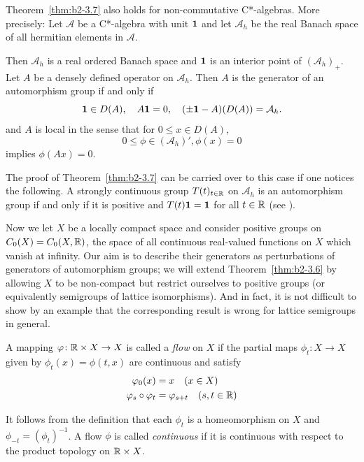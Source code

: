 \begin{remark*}\label{rem:b2-3.7b}
Theorem~\ref{thm:b2-3.7} also holds for non-com\-mutative C*-algebras.
More precisely: Let $\mathcal{A}$ be a C*-algebra with unit $\mathbf{1}$ and let $\mathcal{A}_{h}$ be the real Banach space of all hermitian elements in $\mathcal{A}$.

Then $\mathcal{A}_{h}$ is a real ordered Banach space and $\mathbf{1}$ is an interior point of\/ $(\mathcal{A}_{h})_{+}$.
Let $A$ be a densely defined operator on $\mathcal{A}_{h}$.
Then $A$ is the generator of an automorphism group if and only if\/ 
\[
    \mathbf{1} \in D(A), \quad A\mathbf{1} = 0, \quad
    (\pm\mathbf{1} - A)(D(A)) = \mathcal{A}_{h}.
\]
and $A$ is local in the sense that for $0 \leq x \in D(A)$,
%
\[
	0 \leq \phi \in (\mathcal{A}_{h})', \phi(x) = 0
\]
%
implies $\phi(Ax) = 0$.

The proof of Theorem~\ref{thm:b2-3.7} can be carried over to this case if one notices the following.
A strongly continuous group $T(t)_{t \in \mathbb{R}}$ on $\mathcal{A}_{h}$ is an automorphism group if and only if it is positive and $T(t)\mathbf{1} = \mathbf{1}$ for all $t \in \mathbb{R}$ (see \textcite[Corollary 3.2.21]{brattelirobinson:1979}).
\end{remark*}
Now we let $X$ be a locally compact space and consider positive groups on $C_{0}(X) = C_{0}(X,\mathbb{R})$, the space of all continuous real-valued functions on $X$ which vanish at infinity.
Our aim is to describe their generators as perturbations of generators of automorphism groups; \ie  we will extend Theorem~\ref{thm:b2-3.6} by allowing $X$ to be non-compact but
restrict ourselves to positive groups (or equivalently semigroups of lattice isomorphisms).
And in fact, it is not difficult to show by an example that the corresponding result is wrong for lattice semigroups in general.

A mapping $\phi \colon \R \times X \to X$ is called a \emph{flow} on $X$ if the partial maps $\phi_{t} \colon X \to X$ given by $\phi_{t}(x) = \phi(t,x)$ are continuous and satisfy
\begin{align}
\phi_{0}(x) &= x \quad (x \in X) \label{eq:b2-3.8} \\
\phi_{s} \circ \phi_{t} &= \phi_{s+t} \quad (s,t \in \R) \label{eq:b2-3.9}
\end{align}

It follows from the definition that each $\phi_{t}$ is a homeomorphism on $X$ and 
$\phi_{-t}=(\phi_{t})^{-1}$. 
A flow $\phi$ is called \emph{continuous} if it is continuous with respect to the product topology on $\mathbb{R} \times X$.


